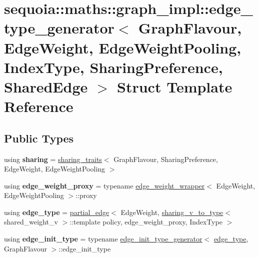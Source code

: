\hypertarget{structsequoia_1_1maths_1_1graph__impl_1_1edge__type__generator}{}\section{sequoia\+::maths\+::graph\+\_\+impl\+::edge\+\_\+type\+\_\+generator$<$ Graph\+Flavour, Edge\+Weight, Edge\+Weight\+Pooling, Index\+Type, Sharing\+Preference, Shared\+Edge $>$ Struct Template Reference}
\label{structsequoia_1_1maths_1_1graph__impl_1_1edge__type__generator}
\subsection*{Public Types}
\begin{DoxyCompactItemize}
\item 
\mbox{\label{structsequoia_1_1maths_1_1graph__impl_1_1edge__type__generator_abaee72b1a216445a74ff50ff296f32ac}} 
using {\bfseries sharing} = \mbox{\hyperlink{structsequoia_1_1maths_1_1graph__impl_1_1sharing__traits}{sharing\+\_\+traits}}$<$ Graph\+Flavour, Sharing\+Preference, Edge\+Weight, Edge\+Weight\+Pooling $>$
\item 
\mbox{\label{structsequoia_1_1maths_1_1graph__impl_1_1edge__type__generator_a190e8a20cd8cfb1965f7832d6330dfa9}} 
using {\bfseries edge\+\_\+weight\+\_\+proxy} = typename \mbox{\hyperlink{structsequoia_1_1maths_1_1graph__impl_1_1edge__weight__wrapper}{edge\+\_\+weight\+\_\+wrapper}}$<$ Edge\+Weight, Edge\+Weight\+Pooling $>$\+::proxy
\item 
\mbox{\label{structsequoia_1_1maths_1_1graph__impl_1_1edge__type__generator_a7cd5ba1045847343e05e97ad8e033069}} 
using {\bfseries edge\+\_\+type} = \mbox{\hyperlink{classsequoia_1_1maths_1_1partial__edge}{partial\+\_\+edge}}$<$ Edge\+Weight, \mbox{\hyperlink{structsequoia_1_1maths_1_1graph__impl_1_1sharing__v__to__type}{sharing\+\_\+v\+\_\+to\+\_\+type}}$<$ shared\+\_\+weight\+\_\+v $>$\+::template policy, edge\+\_\+weight\+\_\+proxy, Index\+Type $>$
\item 
\mbox{\label{structsequoia_1_1maths_1_1graph__impl_1_1edge__type__generator_a35b709b0c653e6e983ebb9ab04d6a74d}} 
using {\bfseries edge\+\_\+init\+\_\+type} = typename \mbox{\hyperlink{structsequoia_1_1maths_1_1graph__impl_1_1edge__init__type__generator}{edge\+\_\+init\+\_\+type\+\_\+generator}}$<$ \mbox{\hyperlink{classsequoia_1_1maths_1_1partial__edge}{edge\+\_\+type}}, Graph\+Flavour $>$\+::edge\+\_\+init\+\_\+type
\end{DoxyCompactItemize}
